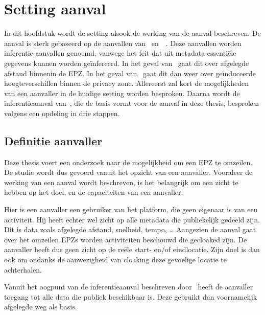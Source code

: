 
\chapter{Setting aanval}\label{chap:inferentieaanval}
In dit hoofdstuk wordt de setting alsook de werking van de aanval beschreven.
De aanval is sterk gebaseerd op de aanvallen van~\citeauthor{Dhondt}
en~\citeauthor{Verdonck_2022}~\cite{Verdonck_2022, Dhondt}. Deze aanvallen
worden inferentie-aanvallen genoemd, vanwege het feit dat uit metadata
essentiële gegevens kunnen worden geïnfereerd. In het geval
van~\citeauthor{Dhondt} gaat dit over afgelegde afstand binnenin de \ac{EPZ}.
In het geval van~\citeauthor{Verdonck_2022} gaat dit dan weer over geïnduceerde
hoogteverschillen binnen de privacy zone. Allereerst zal kort de mogelijkheden
van een aanvaller in de huidige setting worden besproken. Daarna wordt de
inferentieaanval van~\citeauthor{Dhondt}, die de basis vormt voor de aanval in
deze thesis, besproken volgens een opdeling in drie stappen.

\section{Definitie aanvaller}\label{sec:definitie-aanvaller}
Deze thesis voert een onderzoek naar de mogelijkheid om een \ac{EPZ} te
omzeilen. De studie wordt dus gevoerd vanuit het opzicht van een aanvaller.
Vooraleer de werking van een aanval wordt beschreven, is het belangrijk om een
zicht te hebben op het doel, en de capaciteiten van een aanvaller.

Hier is een aanvaller een gebruiker van het platform, die geen eigenaar is van
een activiteit. Hij heeft echter wel zicht op alle metadata die publiekelijk
gedeeld zijn. Dit is data zoals afgelegde afstand, snelheid, tempo, \ldots
Aangezien de aanval gaat over het omzeilen \acp{EPZ} worden activiteiten
beschouwd die gecloaked zijn. De aanvaller heeft dus geen zicht op de reële
start- en/of eindlocatie. Zijn doel is dan ook om ondanks de aanwezigheid van
cloaking deze gevoelige locatie te achterhalen.

Vanuit het oogpunt van de inferentieaanval beschreven door~\citeauthor{Dhondt}
heeft de aanvaller toegang tot alle data die publiek beschikbaar is. Deze
gebruikt dan voornamelijk afgelegde weg als basis.

